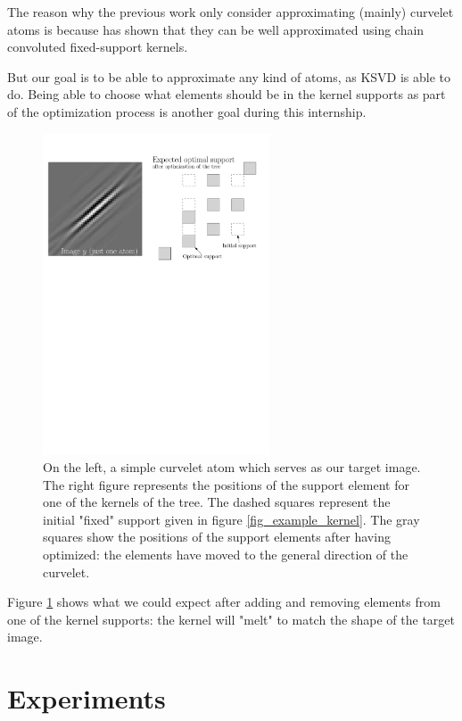 The reason why the previous work only consider approximating (mainly) curvelet atoms is because \cite{chabiron_apprentissage_2015} has shown that they can be well approximated using chain convoluted fixed-support kernels.

But our goal is to be able to approximate any kind of atoms, as \ac{KSVD} is able to do. Being able to choose what elements should be in the kernel supports as part of the optimization process is another goal during this internship.

\begin{figure}[!ht] \centering
\includegraphics[width=0.6\textwidth]{figures/example-optimized-support.pdf}
\caption{On the left, a simple curvelet atom which serves as our target image. The right figure represents the positions of the support element for one of the kernels of the tree. The dashed squares represent the initial "fixed" support given in figure \ref{fig_example_kernel}. The gray squares show the positions of the support elements after having optimized: the elements have moved to the general direction of the curvelet.\label{fig_example_optimal_support}}
\end{figure}

Figure \ref{fig_example_optimal_support} shows what we could expect after adding and removing elements from one of the kernel supports: the kernel will "melt" to match the shape of the target image.


\chapter{Experiments}

